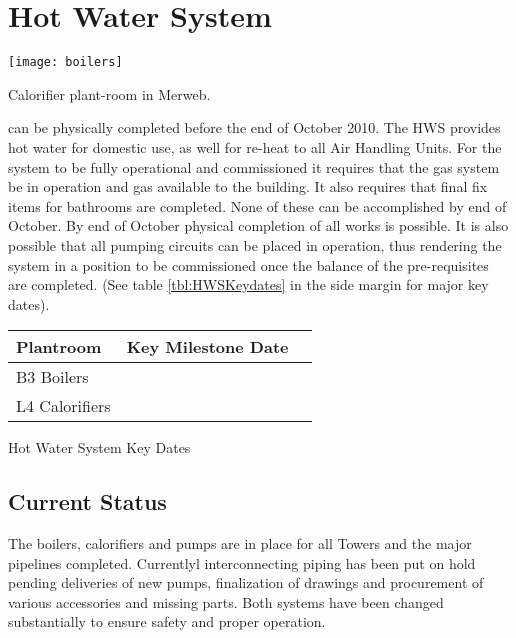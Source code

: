 \chapter{Hot Water System  }
\begin{marginfigure}
  \texttt{[image: boilers]}
  \caption{Calorifier plant-room in Merweb.}
  \label{fig:MWcalorifiers}
\end{marginfigure}

 can be physically completed before the end of October 2010.
The HWS provides hot water for domestic use, as well for re-heat to all Air Handling Units. For the system to be fully operational and commissioned it requires that the gas system  be in operation and gas available to the building. It also requires that final fix items for bathrooms are completed. None of these can be accomplished by end of October. By end of October physical completion of all works is possible. It is also possible that all pumping circuits can be placed in operation, thus rendering the system in a position to be commissioned once the balance of the pre-requisites are completed. (See table \ref{tbl:HWSKeydates} in the side margin for major key dates).


           \begin{margintable} 
	    \begin{tabular}{lcl}
	      \toprule
	      Plantroom    & Key Milestone Date  \\
	      \midrule
	      B3 Boilers             &  \podiumon  \\
	      L4 Calorifiers       &  \toweron  \\
	      \bottomrule
	    \end{tabular}
           \caption{Hot Water System Key Dates}
           \label{tbl:HWSKeydates}
            \end{margintable}
 

\section{Current Status}

The boilers, calorifiers and pumps are in place for all Towers and the major pipelines completed. Currentlyl interconnecting piping has been put on hold pending deliveries of new pumps, finalization of drawings and procurement of various accessories and missing parts. Both systems have been changed substantially to ensure safety and proper operation.

